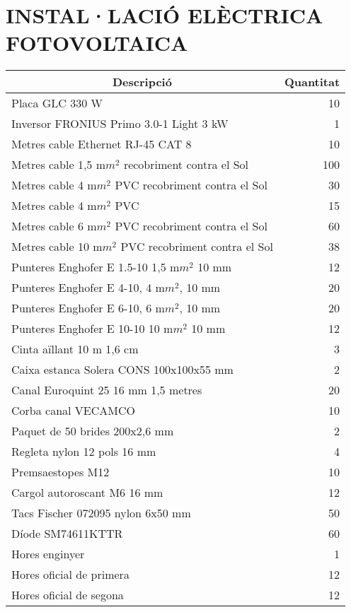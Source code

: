\chapter{\uppercase{Instal·lació elèctrica fotovoltaica}}



\begin{table}[H]
  \centering
    \begin{tabularx} {\textwidth} {|X|r|} \hline
  \multicolumn{1}{|c|}{Descripció} &  \multicolumn{1}{c|}{Quantitat}\\ \hline \hline
    Placa GLC 330 W & 10 \\ \hline
    Inversor FRONIUS Primo 3.0-1 Light 3 kW & 1 \\ \hline
    Metres cable Ethernet RJ-45 CAT 8 & 10 \\ \hline
    Metres cable 1,5 m$m^2$ recobriment contra el Sol & 100 \\ \hline
    Metres cable 4 m$m^2$ PVC recobriment contra el Sol & 30 \\ \hline
    Metres cable 4 m$m^2$ PVC & 15 \\ \hline
    Metres cable 6 m$m^2$ PVC recobriment contra el Sol & 60 \\ \hline
    Metres cable 10 m$m^2$ PVC recobriment contra el Sol & 38 \\ \hline
    Punteres Enghofer E 1.5-10 1,5 m$m^2$ 10 mm & 12 \\ \hline
    Punteres Enghofer E 4-10, 4 m$m^2$, 10 mm & 20 \\ \hline
    Punteres Enghofer E 6-10, 6 m$m^2$, 10 mm & 20 \\ \hline
    Punteres Enghofer E 10-10 10 m$m^2$ 10 mm & 12 \\ \hline
    Cinta aïllant 10 m 1,6 cm & 3 \\ \hline
    Caixa estanca Solera CONS 100x100x55 mm & 2 \\ \hline
    Canal Euroquint 25 16 mm 1,5 metres & 20 \\ \hline
    Corba canal VECAMCO & 10 \\ \hline
    Paquet de 50 brides 200x2,6  mm & 2 \\ \hline
    Regleta nylon 12 pols 16 mm & 4 \\ \hline
    Premsaestopes M12 & 10 \\ \hline
    Cargol autoroscant M6 16 mm & 12 \\ \hline
    Tacs Fischer 072095 nylon 6x50 mm & 50 \\ \hline
    Díode SM74611KTTR & 60 \\ \hline
    Hores enginyer & 1 \\ \hline
    Hores oficial de primera & 12 \\ \hline
    Hores oficial de segona & 12 \\ \hline
    \end{tabularx}%
  \label{tab:addlabel}%
\end{table}%


